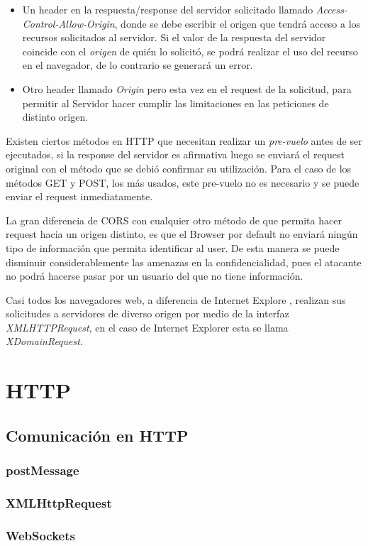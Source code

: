     \begin{itemize}
        \item Un header en la respuesta/response del servidor solicitado llamado \textit{Access-Control-Allow-Origin}, donde se debe escribir el origen que tendrá acceso a los recursos solicitados al servidor. Si el valor de la respuesta del servidor coincide con el \textit{origen} de quién lo solicitó, se podrá realizar el uso del recurso en el navegador, de lo contrario se generará un error.
        \item Otro header llamado \textit{Origin} pero esta vez en el request de la solicitud, para permitir al Servidor hacer cumplir las limitaciones en las peticiones de distinto origen.
    \end{itemize}
    Existen ciertos métodos en HTTP que necesitan realizar un \textit{pre-vuelo} antes de ser ejecutados, si la response del servidor es afirmativa luego se enviará el request original con el método que se debió confirmar su utilización. Para el caso de los métodos GET y POST, los más usados, este pre-vuelo no es necesario y se puede enviar el request inmediatamente.
    
    La gran diferencia de CORS con cualquier otro método de que permita hacer request hacia un origen distinto, es que el Browser por default no enviará ningún tipo de información que permita identificar al user. De esta manera se puede disminuir considerablemente las amenazas en la confidencialidad, pues el atacante no podrá hacerse pasar por un usuario del que no tiene información.
    
    Casi todos los navegadores web, a diferencia de Internet Explore \cite{bookWebAppSec}, realizan sus solicitudes a servidores de  diverso origen por medio de la interfaz \textit{XMLHTTPRequest}, en el caso de Internet Explorer esta se llama \textit{XDomainRequest}.

\section{HTTP}
\label{chap:HTTP}

\subsection{Comunicación en HTTP}
\label{chap:comunHTTP}

\subsubsection{postMessage}
\label{chap:postmessage}

\subsubsection{XMLHttpRequest}
\label{XMLHR}

\subsubsection{WebSockets}
\label{WebSockets}

